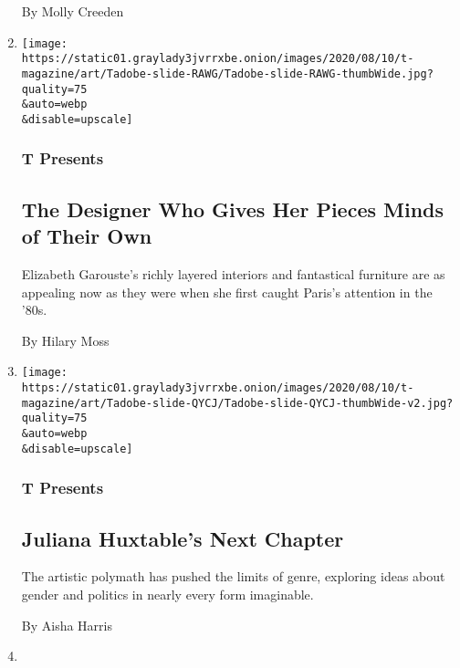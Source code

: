 \begin{enumerate}
  By Molly Creeden
\item
  \href{/2020/08/10/t-magazine/elizabeth-garouste-interior-design.html}{}

  \texttt{[image: https://static01.graylady3jvrrxbe.onion/images/2020/08/10/t-magazine/art/Tadobe-slide-RAWG/Tadobe-slide-RAWG-thumbWide.jpg?quality=75\\\&auto=webp\\\&disable=upscale]}

  \hypertarget{t-presents-4}{%
  \subsubsection{T Presents}\label{t-presents-4}}

  \hypertarget{the-designer-who-gives-her-pieces-minds-of-their-own}{%
  \subsection{The Designer Who Gives Her Pieces Minds of Their
  Own}\label{the-designer-who-gives-her-pieces-minds-of-their-own}}

  Elizabeth Garouste's richly layered interiors and fantastical
  furniture are as appealing now as they were when she first caught
  Paris's attention in the '80s.

  By Hilary Moss
\item
  \href{/2020/08/10/t-magazine/juliana-huxtable.html}{}

  \texttt{[image: https://static01.graylady3jvrrxbe.onion/images/2020/08/10/t-magazine/art/Tadobe-slide-QYCJ/Tadobe-slide-QYCJ-thumbWide-v2.jpg?quality=75\\\&auto=webp\\\&disable=upscale]}

  \hypertarget{t-presents-5}{%
  \subsubsection{T Presents}\label{t-presents-5}}

  \hypertarget{juliana-huxtables-next-chapter}{%
  \subsection{Juliana Huxtable's Next
  Chapter}\label{juliana-huxtables-next-chapter}}

  The artistic polymath has pushed the limits of genre, exploring ideas
  about gender and politics in nearly every form imaginable.

  By Aisha Harris
\item
  \href{/2020/08/10/t-magazine/alice-cicolini-jewelry-art.html}{}


\end{enumerate}
